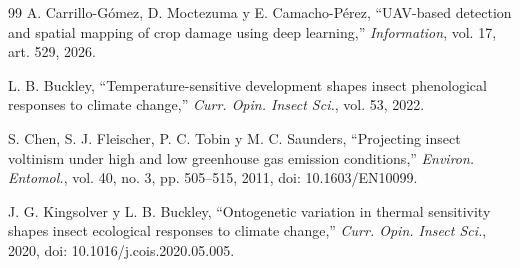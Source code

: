 \documentclass[conference]{IEEEtran}
\begin{document}
\begin{thebibliography}{99}
 A. Carrillo-Gómez, D. Moctezuma y E. Camacho-Pérez, ``UAV-based detection and spatial mapping of crop damage using deep learning,'' \textit{Information}, vol. 17, art. 529, 2026.

 L. B. Buckley, ``Temperature-sensitive development shapes insect phenological responses to climate change,'' \textit{Curr. Opin. Insect Sci.}, vol. 53, 2022.

 S. Chen, S. J. Fleischer, P. C. Tobin y M. C. Saunders, ``Projecting insect voltinism under high and low greenhouse gas emission conditions,'' \textit{Environ. Entomol.}, vol. 40, no. 3, pp. 505--515, 2011, doi: 10.1603/EN10099.

 J. G. Kingsolver y L. B. Buckley, ``Ontogenetic variation in thermal sensitivity shapes insect ecological responses to climate change,'' \textit{Curr. Opin. Insect Sci.}, 2020, doi: 10.1016/j.cois.2020.05.005.

\end{thebibliography}
\end{document}

